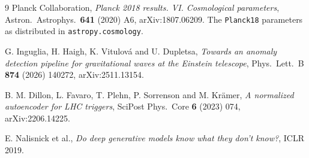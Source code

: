 \documentclass[11pt]{article}
\begin{document}
\begin{thebibliography}{9}
Planck Collaboration,
\emph{Planck 2018 results. VI. Cosmological parameters},
Astron.\ Astrophys.\ \textbf{641} (2020) A6, arXiv:1807.06209.
The \texttt{Planck18} parameters as distributed in \texttt{astropy.cosmology}.

G. Inguglia, H. Haigh, K. Vitulov\'a and U. Dupletsa,
\emph{Towards an anomaly detection pipeline for gravitational waves at the Einstein
telescope}, Phys.\ Lett.\ B \textbf{874} (2026) 140272, arXiv:2511.13154.

B. M. Dillon, L. Favaro, T. Plehn, P. Sorrenson and M. Kr\"amer,
\emph{A normalized autoencoder for LHC triggers}, SciPost Phys.\ Core \textbf{6} (2023)
074, arXiv:2206.14225.

E. Nalisnick et al., \emph{Do deep generative models know what they don't know?},
ICLR 2019.
\end{thebibliography}
\end{document}
